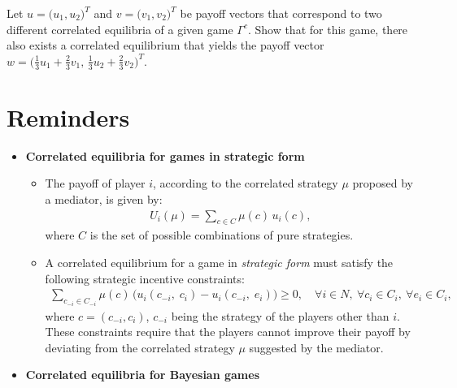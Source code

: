 \documentclass{../ape}
\begin{document}
\thex{}
Let $u = \big( u_1, u_2 \big)^T$ and $v = \big( v_1, v_2 \big)^T$ be payoff vectors that correspond to two different correlated equilibria of a given game $\Gamma^c$. Show that for this game, there also exists a correlated equilibrium that yields the payoff vector $w = \big( \frac{1}{3} u_1 + \frac{2}{3} v_1, \, \frac{1}{3} u_2 + \frac{2}{3} v_2 \big)^T$. 

\newpage

\section*{Reminders}

\begin{itemize}[leftmargin=*]
\renewcommand{\labelitemi}{$\bullet$}

	\item \textbf{Correlated equilibria for games in strategic form}
	\vspace{.3cm}

	\begin{itemize}

		\item The payoff of player $i$, according to the correlated strategy $\mu$ proposed by a mediator, is given by:
		\begin{align*}
			U_i(\mu) = \sum_{c \in C} \mu(c) \, u_i(c),
		\end{align*}
		where $C$ is the set of possible combinations of pure strategies.
			
		\item A correlated equilibrium for a game in \emph{strategic form} must satisfy the following strategic incentive constraints:
		\begin{align*}
			\sum_{c_{-i} \in C_{-i}} \mu(c) \, \big( u_i(c_{-i}, \; c_i) - u_i(c_{-i}, \; e_i) \big) \geq 0, \quad \forall i \in N, \ \forall c_i \in C_i, \ \forall e_i \in C_i,
		\end{align*}
		where $c = (c_{-i}, c_i)$, $c_{-i}$ being the strategy of the players other than $i$. These constraints require that the players cannot improve their payoff by deviating from the correlated strategy $\mu$ suggested by the mediator.
			
	\end{itemize}
	\vspace{.3cm}

	\item \textbf{Correlated equilibria for Bayesian games}
	\vspace{.3cm}


\end{itemize}
\end{document}
